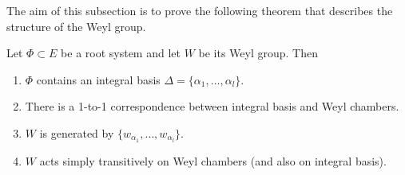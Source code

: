 The aim of this subsection is to prove the following theorem that describes the structure of the Weyl group.

\begin{theorem}\label{thm:weyl}
    Let $\Phi\subset E$ be a root system and let $W$ be its Weyl group. Then
    \begin{enumerate}[label=(\arabic*)]
        \item $\Phi$ contains an integral basis $\Delta=\{\alpha_1,\ldots,\alpha_l\}$.
        \item There is a 1-to-1 correspondence between integral basis and Weyl chambers.
        \item $W$ is generated by $\{w_{\alpha_1},\ldots,w_{\alpha_l}\}$.
        \item $W$ acts simply transitively on Weyl chambers (and also on integral basis).
    \end{enumerate}
\end{theorem}

